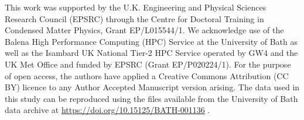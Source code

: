 \documentclass[reprint, superscriptaddress, amsmath,amssymb,prb,twocolumn]{revtex4-2}
\def\SSex{ReS$_{2-x}$Se$_x$}
\def\SeSx{ReSe$_{2-x}$S$_x$}
\newcommand\SOne{1}
\newcommand\STwo{2}
\newcommand\SThree{3}
\newcommand\SFour{4}
\begin{document}

\begin{acknowledgments}
This work was supported by the U.K. Engineering and Physical Sciences Research Council (EPSRC) through the Centre for Doctoral Training in Condensed Matter Physics,
Grant EP/L015544/1. We acknowledge use of the Balena High Performance Computing (HPC) Service at the University of Bath as well as the Isambard UK National Tier-2 HPC Service operated by GW4 and the UK Met Office and funded by EPSRC (Grant EP/P020224/1). For the purpose of open access, the authors have applied a Creative Commons Attribution (CC BY) licence to any Author Accepted Manuscript version arising. The data used in this study can be reproduced using the files available from the University of Bath data archive at \href{https://doi.org/10.15125/BATH-001136}{https://doi.org/10.15125/BATH-001136} \cite{data_archive}.
\end{acknowledgments}



\end{document}
